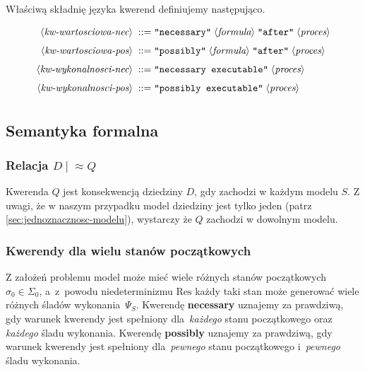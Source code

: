 \documentclass[11pt,a4paper]{article}
\newcommand{\bnfchar}[1]{\texttt{\textquotedbl#1\textquotedbl}}
\newcommand{\bnfsym}[1]{\langle \textit{#1} \rangle}
\theoremstyle{definition}
\begin{document}
Właściwą składnię języka kwerend definiujemy następująco.

\begin{align*}
    \bnfsym{kw-wartosciowa-nec} \;::=\;& \bnfchar{necessary} \; \bnfsym{formula} \; \bnfchar{after} \; \bnfsym{proces} \\[4pt]
    \bnfsym{kw-wartosciowa-pos} \;::=\;& \bnfchar{possibly} \; \bnfsym{formula} \; \bnfchar{after} \; \bnfsym{proces} \\[4pt]    
    \bnfsym{kw-wykonalnosci-nec} \;::=\;& \bnfchar{necessary executable} \; \bnfsym{proces} \\[4pt]
    \bnfsym{kw-wykonalnosci-pos} \;::=\;& \bnfchar{possibly executable} \; \bnfsym{proces} \\[4pt]    
\end{align*}

\subsection{Semantyka formalna}

\subsubsection*{Relacja \texorpdfstring{$D \mid \! \approx Q$}{D |≈ Q}}

Kwerenda $Q$ jest konsekwencją dziedziny $D$, gdy zachodzi w każdym modelu $S$. Z uwagi, że w naszym przypadku model dziedziny jest tylko jeden (patrz \ref{sec:jednoznacznosc-modelu}), wystarczy że $Q$ zachodzi w dowolnym modelu.

\subsubsection*{Kwerendy dla wielu stanów początkowych}

Z założeń problemu model może mieć wiele różnych stanów początkowych $\sigma_0 \in \Sigma_0$, a~z~powodu niedeterminizmu $\mathrm{Res}$ każdy taki stan może generować wiele różnych śladów wykonania~$\Psi_S$. Kwerendę \textbf{necessary} uznajemy za prawdziwą, gdy warunek kwerendy jest spełniony dla~\emph{każdego} stanu początkowego oraz \emph{każdego} śladu wykonania. Kwerendę \textbf{possibly} uznajemy za prawdziwą, gdy warunek kwerendy jest spełniony dla~\emph{pewnego} stanu początkowego i~\emph{pewnego} śladu wykonania.
\end{document}
